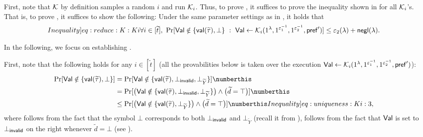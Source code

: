 First, note that $\mathcal{K}$ by definition samples a random $i$ and run $\mathcal{K}_i$. Thus, to prove , it suffices to prove the inequality shown in   for all $\mathcal{K}_i$'s. That is, to prove , it suffices to show the following: Under the same parameter settings as in , it holds that
\begin{equation}\label[Inequality]{eq:reduce:K:Ki}
\forall i\in[\tilde{t}],~
\Pr[\msf{Val} \notin \Set{\msf{val}(\tilde{\tau}), \bot}~:~\msf{Val} \la \mcal{K}_i{(1^\secpar, 1^{\epsilon_1^{-1}}, 1^{\epsilon_2^{-1}}, \msf{pref}')}] \leq {\epsilon_2(\secpar)+\negl(\secpar)}.
\end{equation}


In the following, we focus on establishing .

First, note that the following holds for any $i\in [\tilde{t}]$ (all the provabilities below is taken over the execution $\mathsf{Val} \leftarrow \mathcal{K}_i{(1^\lambda, 1^{\varepsilon_1^{-1}}, 1^{\varepsilon_2^{-1}}, \mathsf{pref}')}$):
\begin{align*}
\Pr[\msf{Val} \notin \Set{\msf{val}(\tilde{\tau}), \bot}] 
& =
\Pr[\msf{Val} \notin \Set{\msf{val}(\tilde{\tau}),\bot_\msf{invalid},\bot_{\tilde{Y}}}] \numberthis \label{eq:uniqueness:Ki:1} \\
& =
\Pr[\big(\msf{Val} \notin \Set{\msf{val}(\tilde{\tau}),\bot_\msf{invalid},\bot_{\tilde{Y}}}\big) \wedge \big( \tilde{d} = \top \big)] \numberthis \label{eq:uniqueness:Ki:2} \\
& \le
\Pr[\big(\msf{Val} \notin \Set{\msf{val}(\tilde{\tau}),\bot_{\tilde{Y}}}\big) \wedge \big( \tilde{d} = \top \big)] \numberthis \label[Inequality]{eq:uniqueness:Ki:3} 
,\end{align*}
where  follows from the fact that the symbol $\bot$ corresponds to both $\bot_{\mathsf{invalid}}$ and $\bot_{\tilde{Y}}$ (recall it from ),  follows from the fact that 
$\mathsf{Val}$ is set to $\bot_\mathsf{invalid}$ on the right whenever $\tilde{d}=\bot$ (see ).

